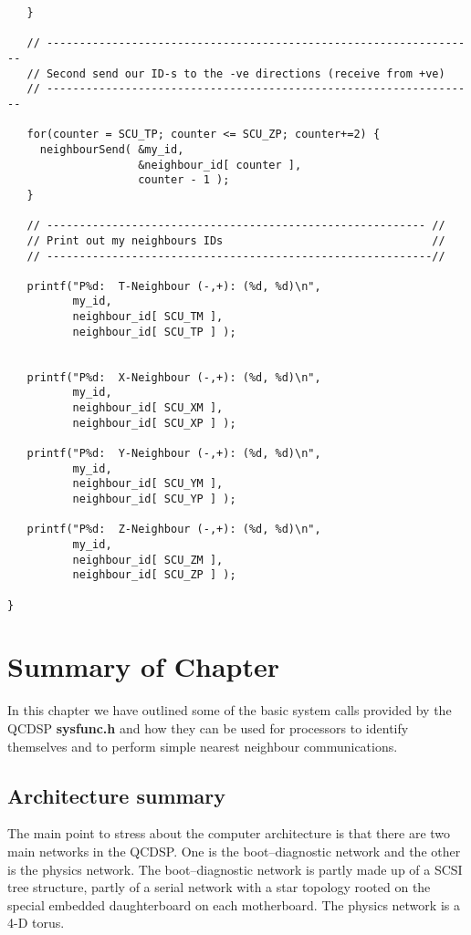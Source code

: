 {\begin{verbatim}
   }
 
   // ------------------------------------------------------------------
   // Second send our ID-s to the -ve directions (receive from +ve)
   // ------------------------------------------------------------------
  
   for(counter = SCU_TP; counter <= SCU_ZP; counter+=2) {
     neighbourSend( &my_id,
                    &neighbour_id[ counter ],
                    counter - 1 );
   }

   // ---------------------------------------------------------- //
   // Print out my neighbours IDs                                //
   // -----------------------------------------------------------//

   printf("P%d:  T-Neighbour (-,+): (%d, %d)\n",
          my_id,
          neighbour_id[ SCU_TM ],
          neighbour_id[ SCU_TP ] );


   printf("P%d:  X-Neighbour (-,+): (%d, %d)\n",
          my_id,
          neighbour_id[ SCU_XM ],
          neighbour_id[ SCU_XP ] );

   printf("P%d:  Y-Neighbour (-,+): (%d, %d)\n",
          my_id,
          neighbour_id[ SCU_YM ],
          neighbour_id[ SCU_YP ] );

   printf("P%d:  Z-Neighbour (-,+): (%d, %d)\n",
          my_id,
          neighbour_id[ SCU_ZM ],
          neighbour_id[ SCU_ZP ] );

}
\end{verbatim}
}

\section{Summary of Chapter}
In this chapter we have outlined some of the basic system
calls provided by the QCDSP {\bf sysfunc.h} and how they
can be used for processors to identify themselves and to 
perform simple nearest neighbour communications.

\subsection{Architecture summary}
The main point to stress about the computer architecture is that
there are two main networks in the QCDSP. One is the boot--diagnostic
network and the other is the physics network. The boot--diagnostic 
network is partly made up of a SCSI tree structure, partly of a 
serial network with a star topology rooted on the special embedded
daughterboard on each motherboard. The physics network is a 4-D
torus.


